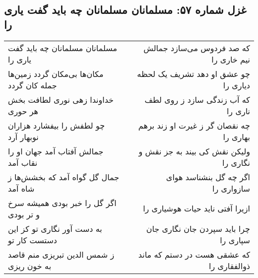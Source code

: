 \begin{center}
\section*{غزل شماره ۵۷: مسلمانان مسلمانان چه باید گفت یاری را}
\label{sec:0057}
\begin{longtable}{l p{0.5cm} r}
مسلمانان مسلمانان چه باید گفت یاری را
&&
که صد فردوس می‌سازد جمالش نیم خاری را
\\
مکان‌ها بی‌مکان گردد زمین‌ها جمله کان گردد
&&
چو عشق او دهد تشریف یک لحظه دیاری را
\\
خداوندا زهی نوری لطافت بخش هر حوری
&&
که آب زندگی سازد ز روی لطف ناری را
\\
چو لطفش را بیفشارد هزاران نوبهار آرد
&&
چه نقصان گر ز غیرت او زند برهم بهاری را
\\
جمالش آفتاب آمد جهان او را نقاب آمد
&&
ولیکن نقش کی بیند به جز نقش و نگاری را
\\
جمال گل گواه آمد که بخشش‌ها ز شاه آمد
&&
اگر چه گل بنشناسد هوای سازواری را
\\
اگر گل را خبر بودی همیشه سرخ و تر بودی
&&
ازیرا آفتی ناید حیات هوشیاری را
\\
به دست آور نگاری تو کز این دستست کار تو
&&
چرا باید سپردن جان نگاری جان سپاری را
\\
ز شمس الدین تبریزی منم قاصد به خون ریزی
&&
که عشقی هست در دستم که ماند ذوالفقاری را
\\
\end{longtable}
\end{center}
